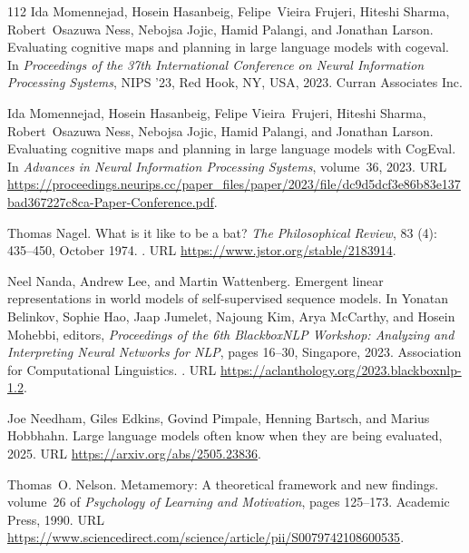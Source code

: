 \begin{thebibliography}{112}
Ida Momennejad, Hosein Hasanbeig, Felipe~Vieira Frujeri, Hiteshi Sharma, Robert~Osazuwa Ness, Nebojsa Jojic, Hamid Palangi, and Jonathan Larson.
\newblock Evaluating cognitive maps and planning in large language models with cogeval.
\newblock In \emph{Proceedings of the 37th International Conference on Neural Information Processing Systems}, NIPS '23, Red Hook, NY, USA, 2023{}. Curran Associates Inc.

Ida Momennejad, Hosein Hasanbeig, Felipe Vieira~Frujeri, Hiteshi Sharma, Robert~Osazuwa Ness, Nebojsa Jojic, Hamid Palangi, and Jonathan Larson.
\newblock Evaluating cognitive maps and planning in large language models with {CogEval}.
\newblock In \emph{Advances in Neural Information Processing Systems}, volume~36, 2023{}.
\newblock URL \url{https://proceedings.neurips.cc/paper_files/paper/2023/file/dc9d5dcf3e86b83e137bad367227c8ca-Paper-Conference.pdf}.

Thomas Nagel.
\newblock What is it like to be a bat?
\newblock \emph{The Philosophical Review}, 83 (4): 435--450, October 1974.
\newblock {}.
\newblock URL \url{https://www.jstor.org/stable/2183914}.

Neel Nanda, Andrew Lee, and Martin Wattenberg.
\newblock Emergent linear representations in world models of self-supervised sequence models.
\newblock In Yonatan Belinkov, Sophie Hao, Jaap Jumelet, Najoung Kim, Arya McCarthy, and Hosein Mohebbi, editors, \emph{Proceedings of the 6th BlackboxNLP Workshop: Analyzing and Interpreting Neural Networks for NLP}, pages 16--30, Singapore, 2023. Association for Computational Linguistics.
\newblock {}.
\newblock URL \url{https://aclanthology.org/2023.blackboxnlp-1.2}.

Joe Needham, Giles Edkins, Govind Pimpale, Henning Bartsch, and Marius Hobbhahn.
\newblock Large language models often know when they are being evaluated, 2025.
\newblock URL \url{https://arxiv.org/abs/2505.23836}.

Thomas~O. Nelson.
\newblock Metamemory: A theoretical framework and new findings.
\newblock volume~26 of \emph{Psychology of Learning and Motivation}, pages 125--173. Academic Press, 1990.
\newblock URL \url{https://www.sciencedirect.com/science/article/pii/S0079742108600535}.


\end{thebibliography}
